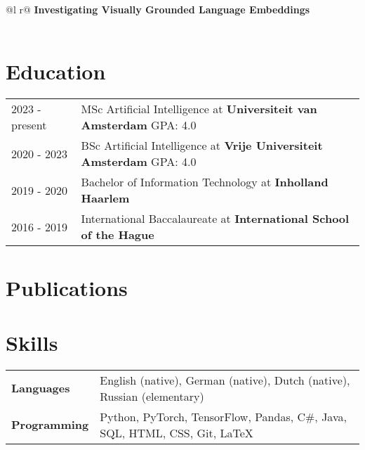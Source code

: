 \documentclass[a4paper,12pt]{article}
\begin{document}
\begin{tabularx}{\linewidth}{ @{}l r@{} }
\textbf{Investigating Visually Grounded Language Embeddings}\\%
\\
\end{tabularx}

\section{Education}
\begin{tabularx}{\linewidth}{@{}l X@{}}	
2023 - present & MSc Artificial Intelligence at \textbf{Universiteit van Amsterdam} \hfill \normalsize GPA: 4.0 \\

2020 - 2023 & BSc Artificial Intelligence at \textbf{Vrije Universiteit Amsterdam} \hfill GPA: 4.0 \\ 

2019 - 2020 & Bachelor of Information Technology at \textbf{Inholland Haarlem}\hfill  \\

2016 - 2019 & International Baccalaureate at \textbf{International School of the Hague} \hfill  \\
\end{tabularx}

\section{Publications}
\begin{refsection}
\nocite{*}
\printbibliography[heading=none]
\end{refsection}

\section{Skills}
\begin{tabularx}{\linewidth}{@{}l X@{}}
\textbf{Languages} & English (native), German (native), Dutch (native), Russian (elementary) \\
\textbf{Programming} & Python, PyTorch, TensorFlow, Pandas, C\#, Java, SQL, HTML, CSS, Git, LaTeX
\end{tabularx}

\vfill
{}
\end{document}

